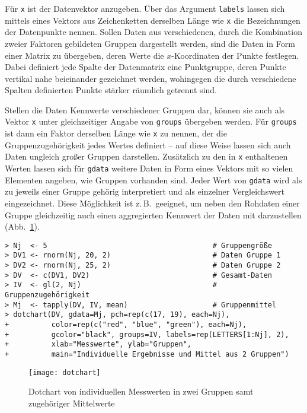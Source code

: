 Für \lstinline!x! ist der Datenvektor anzugeben. Über das Argument \lstinline!labels! lassen sich mittels eines Vektors aus Zeichenketten derselben Länge wie \lstinline!x! die Bezeichnungen der Datenpunkte nennen. Sollen Daten aus verschiedenen, durch die Kombination zweier Faktoren gebildeten Gruppen dargestellt werden, sind die Daten in Form einer Matrix zu übergeben, deren Werte die $x$-Koordinaten der Punkte festlegen. Dabei definiert jede Spalte der Datenmatrix eine Punktgruppe, deren Punkte vertikal nahe beieinander gezeichnet werden, wohingegen die durch verschiedene Spalten definierten Punkte stärker räumlich getrennt sind.

Stellen die Daten Kennwerte verschiedener Gruppen dar, können sie auch als Vektor \lstinline!x! unter gleichzeitiger Angabe von \lstinline!groups! übergeben werden. Für \lstinline!groups! ist dann ein Faktor derselben Länge wie \lstinline!x! zu nennen, der die Gruppenzugehörigkeit jedes Wertes definiert -- auf diese Weise lassen sich auch Daten ungleich großer Gruppen darstellen. Zusätzlich zu den in \lstinline!x! enthaltenen Werten lassen sich für \lstinline!gdata! weitere Daten in Form eines Vektors mit so vielen Elementen angeben, wie Gruppen vorhanden sind. Jeder Wert von \lstinline!gdata! wird als zu jeweils einer Gruppe gehörig interpretiert und als einzelner Vergleichswert eingezeichnet. Diese Möglichkeit ist z.\,B.\ geeignet, um neben den Rohdaten einer Gruppe gleichzeitig auch einen aggregierten Kennwert der Daten mit darzustellen (Abb.\ \ref{fig:dotchart}).
\begin{lstlisting}
> Nj  <- 5                                       # Gruppengröße
> DV1 <- rnorm(Nj, 20, 2)                        # Daten Gruppe 1
> DV2 <- rnorm(Nj, 25, 2)                        # Daten Gruppe 2
> DV  <- c(DV1, DV2)                             # Gesamt-Daten
> IV  <- gl(2, Nj)                               # Gruppenzugehörigkeit
> Mj  <- tapply(DV, IV, mean)                    # Gruppenmittel
> dotchart(DV, gdata=Mj, pch=rep(c(17, 19), each=Nj),
+          color=rep(c("red", "blue", "green"), each=Nj),
+          gcolor="black", groups=IV, labels=rep(LETTERS[1:Nj], 2),
+          xlab="Messwerte", ylab="Gruppen",
+          main="Individuelle Ergebnisse und Mittel aus 2 Gruppen")
\end{lstlisting}

\begin{figure}[ht]
\centering
\texttt{[image: dotchart]}
\vspace*{-1em}
\caption{Dotchart von individuellen Messwerten in zwei Gruppen samt zugehöriger Mittelwerte}
\label{fig:dotchart}
\end{figure}

